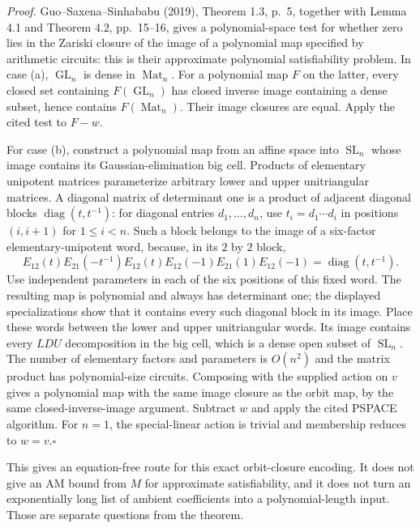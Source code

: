 \emph{Proof.} Guo--Saxena--Sinhababu (2019), Theorem 1.3, p.~5, together
with Lemma 4.1 and Theorem 4.2, pp.~15--16, gives a polynomial-space test
for whether zero lies in the Zariski closure of the image of a polynomial
map specified by arithmetic circuits: this is their approximate polynomial
satisfiability problem. In case (a), $\operatorname{GL}_n$ is dense in
$\operatorname{Mat}_n$. For a polynomial map $F$ on the latter, every closed
set containing $F(\operatorname{GL}_n)$ has closed inverse image containing
a dense subset, hence contains $F(\operatorname{Mat}_n)$. Their image
closures are equal. Apply the cited test to $F-w$.

For case (b), construct a polynomial map from an affine space into
$\operatorname{SL}_n$ whose image contains its Gaussian-elimination big
cell. Products of elementary unipotent matrices parameterize arbitrary
lower and upper unitriangular matrices. A diagonal matrix of determinant
one is a product of adjacent diagonal blocks
$\operatorname{diag}(t,t^{-1})$: for diagonal entries $d_1,\ldots,d_n$,
use $t_i=d_1\cdots d_i$ in positions $(i,i+1)$ for $1\leq i<n$.
Such a block belongs to the image of a
six-factor elementary-unipotent word, because, in its $2$ by $2$ block,
\[
 E_{12}(t)E_{21}(-t^{-1})E_{12}(t)
 E_{12}(-1)E_{21}(1)E_{12}(-1)
       =\operatorname{diag}(t,t^{-1}).
\]
Use independent parameters in each of the six positions of this fixed
word. The resulting map is polynomial and always has determinant one;
the displayed specializations show that it contains every such diagonal
block in its image. Place these words between the lower and upper
unitriangular words. Its image contains every $LDU$ decomposition in the
big cell, which is a dense open subset of $\operatorname{SL}_n$.
The number of elementary factors and parameters is $O(n^2)$ and the
matrix product has polynomial-size circuits. Composing with the supplied
action on $v$ gives a polynomial map with the same image closure as the
orbit map, by the same closed-inverse-image argument. Subtract $w$ and
apply the cited PSPACE algorithm. For $n=1$, the special-linear action is
trivial and membership reduces to $w=v$.\hfill$\square$

This gives an equation-free route for this exact orbit-closure encoding.
It does not give an AM bound from $M$ for approximate satisfiability, and
it does not turn an exponentially long list of ambient coefficients into
a polynomial-length input. Those are separate questions from the theorem.

